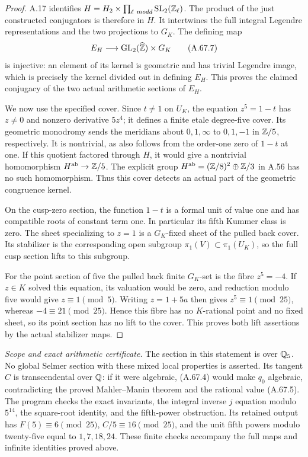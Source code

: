 \begin{proof}
A.17 identifies
$H=H_2\times\prod_{\ell\ {
m odd}}
\operatorname{SL}_2(\mathbb Z_\ell)$.
The product of the just constructed conjugators is
therefore in $H$.  It intertwines the full integral
Legendre representations and the two projections to
$G_K$.  The defining map
\[
                  E_H\longrightarrow
                  \operatorname{GL}_2(\widehat{\mathbb Z})\times G_K
\tag{A.67.7}
\]
is injective: an element of its kernel is geometric
and has trivial Legendre image, which is precisely
the kernel divided out in defining $E_H$.
This proves the claimed conjugacy of the two actual
arithmetic sections of $E_H$.

We now use the specified cover.  Since $t\ne1$ on
$U_K$, the equation $z^5=1-t$ has $z\ne0$ and
nonzero derivative $5z^4$; it defines a finite etale
degree-five cover.
Its geometric monodromy sends the meridians about
$0,1,\infty$ to $0,1,-1$ in $\mathbb Z/5$, respectively.
It is nontrivial, as also follows from the order-one
zero of $1-t$ at one.  If this quotient factored
through $H$, it would give a nontrivial homomorphism
$H^{\rm ab}\to\mathbb Z/5$.
The explicit group
$H^{\rm ab}=(\mathbb Z/8)^2\oplus\mathbb Z/3$ in A.56 has no
such homomorphism.  Thus this cover detects an
actual part of the geometric congruence kernel.

On the cusp-zero section, the function $1-t$ is a
formal unit of value one and has compatible roots
of constant term one.  In particular its fifth
Kummer class is zero.  The sheet specializing to
$z=1$ is a $G_K$-fixed sheet of the pulled back
cover.  Its stabilizer is the corresponding open
subgroup $\pi_1(V)\subset\pi_1(U_K)$, so the full
cusp section lifts to this subgroup.

For the point section of five the pulled back
finite $G_K$-set is the fibre $z^5=-4$.
If $z\in K$ solved this equation, its valuation
would be zero, and reduction modulo five would
give $z\equiv1\pmod5$.  Writing $z=1+5a$ then
gives $z^5\equiv1\pmod{25}$, whereas
$-4\equiv21\pmod{25}$.  Hence this fibre has no
$K$-rational point and no fixed sheet, so its
point section has no lift to the cover.
This proves both lift assertions by the actual
stabilizer maps.
\end{proof}

\noindent\emph{Scope and exact arithmetic certificate.}
The section in this statement is over $\mathbb Q_5$.
No global Selmer section with these mixed local
properties is asserted.
Its tangent $C$ is transcendental over $\mathbb Q$:
if it were algebraic, (A.67.4) would make $q_0$
algebraic, contradicting the proved Mahler--Manin
theorem and the rational value (A.67.5).
The program
checks the exact invariants, the integral inverse
$j$ equation modulo $5^{14}$, the square-root
identity, and the fifth-power obstruction.
Its retained output has $F(5)\equiv6\pmod{25}$,
$C/5\equiv16\pmod{25}$, and the unit fifth powers
modulo twenty-five equal to $1,7,18,24$.
These finite checks accompany the full maps and
infinite identities proved above.
